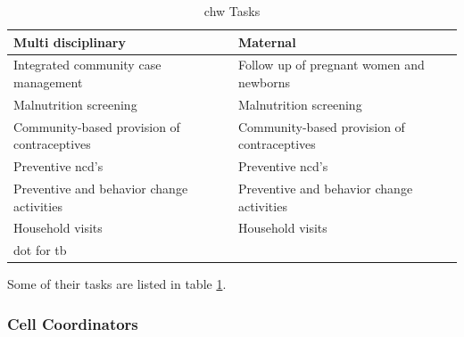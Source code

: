 \begin{table}
\centering
\begin{tabular}{|p{5cm}|p{5cm}|}
\hline
\textbf{Multi disciplinary} & \textbf{Maternal} \\
\hline
Integrated community case management & Follow up of pregnant women and newborns \\
\hline
Malnutrition screening & Malnutrition screening \\
\hline
Community-based provision of contraceptives & Community-based provision of contraceptives \\
\hline
Preventive \gls{ncd}'s & Preventive \gls{ncd}'s \\
\hline
Preventive and behavior change activities & Preventive and behavior change activities \\
\hline
Household visits & Household visits \\
\hline
\gls{dot} for \gls{tb} & \\
\hline
\end{tabular}
\caption{\gls{chw} Tasks}
\label{table:chwtasks}
\end{table}

Some of their tasks are listed in table \ref{table:chwtasks}.

\cite{chd:strategy}

\subsubsection{Cell Coordinators}

